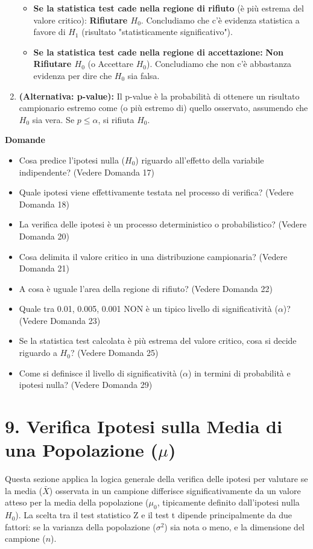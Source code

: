 \documentclass[12pt, a4paper]{article}
\newenvironment{reflectionbox}{%
    \medskip %
    \begin{framed}\par\noindent
    \textbf{\color{boxtitlecolor}Domande} \par
    \begin{itemize}[leftmargin=*, label=$\blacktriangleright$]
}{%
    \end{itemize}\par
    \end{framed}
    \medskip %
}
\newcommand{\popmean}{\mu} %
\newcommand{\samplemean}{\bar{X}} %
\newcommand{\popvar}{\sigma^2} %
\newcommand{\alphaerr}{\alpha} %
\newcommand{\Hnull}{H_0} %
\newcommand{\Halt}{H_1} %
\begin{document}
\begin{enumerate}
\begin{itemize}
            \item \textbf{Se la statistica test cade nella regione di rifiuto} (è più estrema del valore critico): \textbf{Rifiutare $\Hnull$}. Concludiamo che c'è evidenza statistica a favore di $\Halt$ (risultato "statisticamente significativo").
            \item \textbf{Se la statistica test cade nella regione di accettazione:} \textbf{Non Rifiutare $\Hnull$} (o Accettare $\Hnull$). Concludiamo che non c'è abbastanza evidenza per dire che $\Hnull$ sia falsa.
        \end{itemize}
    \item \textbf{(Alternativa: p-value):} Il p-value è la probabilità di ottenere un risultato campionario estremo come (o più estremo di) quello osservato, assumendo che $\Hnull$ sia vera. Se $p \le \alphaerr$, si rifiuta $\Hnull$.
\end{enumerate}

\begin{reflectionbox}
    \item Cosa predice l'ipotesi nulla ($\Hnull$) riguardo all'effetto della variabile indipendente? (Vedere Domanda 17)
    \item Quale ipotesi viene effettivamente testata nel processo di verifica? (Vedere Domanda 18)
    \item La verifica delle ipotesi è un processo deterministico o probabilistico? (Vedere Domanda 20)
    \item Cosa delimita il valore critico in una distribuzione campionaria? (Vedere Domanda 21)
    \item A cosa è uguale l'area della regione di rifiuto? (Vedere Domanda 22)
    \item Quale tra 0.01, 0.005, 0.001 NON è un tipico livello di significatività ($\alphaerr$)? (Vedere Domanda 23)
    \item Se la statistica test calcolata è più estrema del valore critico, cosa si decide riguardo a $\Hnull$? (Vedere Domanda 25)
    \item Come si definisce il livello di significatività ($\alphaerr$) in termini di probabilità e ipotesi nulla? (Vedere Domanda 29)
\end{reflectionbox}

\section*{9. Verifica Ipotesi sulla Media di una Popolazione ($\popmean$)}
Questa sezione applica la logica generale della verifica delle ipotesi per valutare se la media ($\samplemean$) osservata in un campione differisce significativamente da un valore atteso per la media della popolazione ($\mu_0$, tipicamente definito dall'ipotesi nulla $\Hnull$). La scelta tra il test statistico Z e il test t dipende principalmente da due fattori: se la varianza della popolazione ($\popvar$) sia nota o meno, e la dimensione del campione ($n$).
\end{document}
